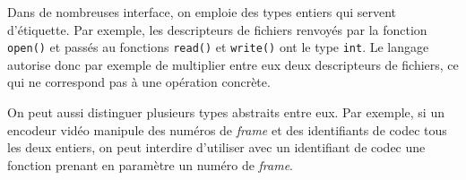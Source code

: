 Dans de nombreuses interface, on emploie des types entiers qui servent
d'étiquette. Par exemple, les descripteurs de fichiers renvoyés par la fonction
\texttt{open()} et passés au fonctions \texttt{read()} et \texttt{write()} ont
le type \texttt{int}. Le langage autorise donc par exemple de multiplier entre
eux deux descripteurs de fichiers, ce qui ne correspond pas à une opération
concrète.

On peut aussi distinguer plusieurs types abstraits entre eux. Par exemple, si un
encodeur vidéo manipule des numéros de \emph{frame} et des identifiants de codec
tous les deux entiers, on peut interdire d'utiliser avec un identifiant de codec
une fonction prenant en paramètre un numéro de \emph{frame}.

